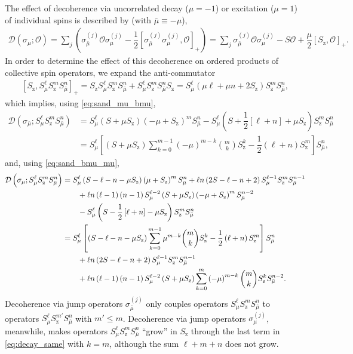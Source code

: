 \documentclass[aps,notitlepage,nofootinbib,11pt]{revtex4-1}
\newcommand{\f}[2]{\dfrac{#1}{#2}} %
\newcommand{\p}[1]{\left(#1\right)} %
\renewcommand{\sp}[1]{\left[#1\right]} %
\newcommand{\D}{\mathcal{D}}
\renewcommand{\O}{\mathcal{O}}
\newcommand{\z}{\text{z}}
\newcommand{\bmu}{{\bar\mu}}
\newcommand{\1}{\mathds{1}}
\begin{document}
The effect of decoherence via uncorrelated decay ($\mu=-1$) or
excitation ($\mu=1$) of individual spins is described by (with
$\bmu\equiv-\mu$),
\begin{align}
  \D\p{\sigma_\mu; \O}
  = \sum_j\p{\sigma_\bmu^{(j)} \O \sigma_\mu^{(j)}
    - \f12\sp{\sigma_\bmu^{(j)} \sigma_\mu^{(j)},\O}_+}
  = \sum_j \sigma_\bmu^{(j)} \O \sigma_\mu^{(j)}
    - S \O + \f{\mu}{2} \sp{S_\z, \O}_+.
\end{align}
In order to determine the effect of this decoherence on ordered
products of collective spin operators, we expand the anti-commutator
\begin{align}
  \sp{S_\z, S_\mu^\ell S_\z^m S_\bmu^n}_+
  = S_\z S_\mu^\ell S_\z^m S_\bmu^n + S_\mu^\ell S_\z^m S_\bmu^n S_\z
  = S_\mu^\ell\p{\mu\ell + \mu n + 2 S_\z} S_\z^m S_\bmu^n,
\end{align}
which implies, using \eqref{eq:sand_mu_bmu},
\begin{align}
  \D\p{\sigma_\bmu; S_\mu^\ell S_\z^m S_\bmu^n}
  &= S_\mu^\ell \p{S+\mu S_\z}\p{-\mu+S_\z}^m S_\bmu^n
  - S_\mu^\ell\p{S + \f12\sp{\ell+n} + \mu S_\z} S_\z^m S_\bmu^n \\
  &= S_\mu^\ell \sp{\p{S+\mu S_\z}
    \sum_{k=0}^{m-1} \p{-\mu}^{m-k} { m \choose k } S_\z^k
    - \f12 \p{\ell+n} S_\z^m} S_\bmu^n,
  \label{eq:decay_diff}
\end{align}
and, using \eqref{eq:sand_bmu_mu},
\begin{align}
  \D\p{\sigma_\mu; S_\mu^\ell S_\z^m S_\bmu^n}
  &= S_\mu^\ell \p{S - \ell - n - \mu S_\z} \p{\mu + S_\z}^m S_\bmu^n
  + \ell n \p{2S - \ell - n + 2}
  S_\mu^{\ell-1} S_\z^m S_\bmu^{n-1} \notag \\
  &\qquad + \ell n \p{\ell-1} \p{n-1} S_\mu^{\ell-2} \p{S + \mu S_\z}
  \p{-\mu + S_\z}^m S_\bmu^{n-2} \notag \\
  &\qquad - S_\mu^\ell\p{S - \f12\sp{\ell+n} - \mu S_\z}
  S_\z^m S_\bmu^n \allowdisplaybreaks \\
  &= S_\mu^\ell \sp{\p{S-\ell-n-\mu S_\z}
    \sum_{k=0}^{m-1} \mu^{m-k} { m \choose k } S_\z^k
    - \f12 \p{\ell+n} S_\z^m} S_\bmu^n \notag \\
  &\qquad + \ell n \p{2S - \ell - n + 2}
  S_\mu^{\ell-1} S_\z^m S_\bmu^{n-1} \notag \\
  &\qquad + \ell n \p{\ell-1} \p{n-1} S_\mu^{\ell-2} \p{S + \mu S_\z}
  \sum_{k=0}^m \p{-\mu}^{m-k} { m \choose k } S_\z^k S_\bmu^{n-2}.
  \label{eq:decay_same}
\end{align}
Decoherence via jump operators $\sigma_\bmu^{(j)}$ only couples
operators $S_\mu^\ell S_\z^m S_\bmu^n$ to operators
$S_\mu^\ell S_\z^{m'} S_\bmu^n$ with $m'\le m$.  Decoherence via jump
operators $\sigma_\mu^{(j)}$, meanwhile, makes operators
$S_\mu^\ell S_\z^m S_\bmu^n$ ``grow'' in $S_\z$ through the last term
in \eqref{eq:decay_same} with $k=m$, although the sum $\ell+m+n$ does
not grow.
\end{document}
